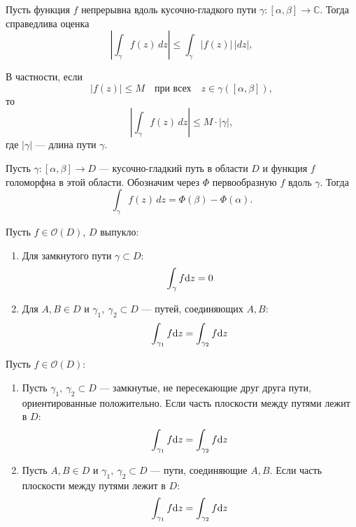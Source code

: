 \begin{theorem}
Пусть функция $f$ непрерывна вдоль кусочно-гладкого пути $\gamma: [\alpha, \beta] \to \mathbb{C}$. Тогда справедлива оценка
\[
\left| \int_{\gamma} f(z) \, dz \right| \leq \int_{\gamma} |f(z)| \, |dz|,
\]

В частности, если
\[
|f(z)| \leq M \quad \text{при всех} \quad z \in \gamma([\alpha, \beta]),
\]
то
\[
\left| \int_{\gamma} f(z) \, dz \right| \leq M \cdot |\gamma|,
\]
где $|\gamma|$ --- длина пути $\gamma$.
\end{theorem}

\begin{theorem}
Пусть $\gamma: [\alpha, \beta] \to D$ --- кусочно-гладкий путь в области $D$ и функция $f$ голоморфна в этой области. Обозначим через $\Phi$ первообразную $f$ вдоль $\gamma$. Тогда
\[
\int_{\gamma} f(z) \, dz = \Phi(\beta) - \Phi(\alpha).
\]
\end{theorem}

\begin{theorem}[Коши-2]
  Пусть \( f\in\mathcal{O}(D) \), $D$ выпукло:
  
  \begin{enumerate}
    \item Для замкнутого пути \( \gamma\subset D \):
    \[ \int_\gamma f\mathrm{d} z=0 \]

    \item Для \( A,B\in D \) и \( \gamma_1,\ \gamma_2\subset D \) --- путей, соединяющих \( A,B \):
    \[ \int_{\gamma_1}f\mathrm{d} z=\int_{\gamma_2}f\mathrm{d} z \]
  \end{enumerate}
\end{theorem}

\begin{theorem}[Коши-3]
  Пусть \( f\in\mathcal{O}(D) \):
  
  \begin{enumerate}
    \item Пусть \( \gamma_1,\ \gamma_2\subset D \) --- замкнутые, не пересекающие друг друга пути, ориентированные положительно. Если часть плоскости между путями лежит в $D$:
    \[ \int_{\gamma_1}f\mathrm{d} z=\int_{\gamma_2}f\mathrm{d} z \]

    \item Пусть \( A,B\in D \) и \( \gamma_1,\ \gamma_2\subset D \) --- пути, соединяющие \( A,B \). Если часть плоскости между путями лежит в $D$:
    \[ \int_{\gamma_1}f\mathrm{d} z=\int_{\gamma_2}f\mathrm{d} z \]
  \end{enumerate}
\end{theorem}

